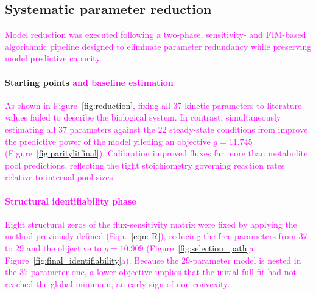 \documentclass[conference]{IEEEtran}
\begin{document}
\subsection{Systematic parameter reduction}
 \textcolor{magenta}{Model reduction was executed following a two-phase, sensitivity- and FIM-based algorithmic pipeline designed to eliminate parameter redundancy while preserving model predictive capacity.}

 
\paragraph{Starting points \textcolor{magenta}{and baseline estimation}}
\textcolor{magenta}{As shown in Figure~\ref{fig:reduction}, fixing all 37 kinetic parameters to literature values failed to describe the biological system. In contrast, simultaneously estimating all 37 parameters against the 22 steady-state conditions from \textcite{Ishii2007a} improve the predictive power of the model yileding an objective  $g= 11.745$ (Figure~\ref{fig:paritylitfinal}). Calibration improved fluxes far more than metabolite pool predictions, reflecting the tight stoichiometry governing reaction rates relative to internal pool sizes.}
\textcolor{magenta}{\paragraph{Structural identifiability phase}
Eight structural zeros of the flux-sensitivity matrix were fixed by applying the method previously defined (Eqn.~\ref{eqn: R}), reducing the free parameters from 37 to 29 and the objective to $g=10.909$ (Figure~\ref{fig:selection_path}a, Figure~\ref{fig:final_identifiability}a). Because the 29-parameter model is nested in the 37-parameter one, a lower objective implies that the initial full fit had not reached the global minimum, an early sign of non-convexity.}
\end{document}
